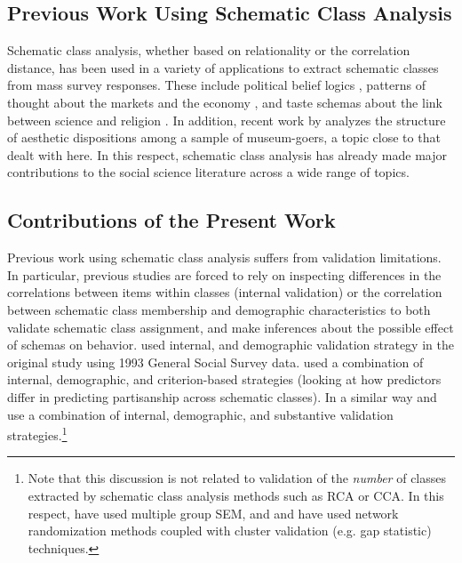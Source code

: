 \documentclass[preprint, authoryear,11pt, 3p]{elsarticle}
\begin{document}
\subsection{Previous Work Using Schematic Class Analysis}
Schematic class analysis, whether based on relationality or the correlation distance, has been used in a variety of applications to extract schematic classes from mass survey responses. These include political belief logics \citep{baldassarri2014neither, daenekindt2017people}, patterns of thought about the markets and the economy \citep{dimaggio2018searching, metzmcDonnell2018multiple}, and taste schemas about the link between science and religion \citep{dimaggio2017culture}. In addition, recent work by \citet{daenekindt2017structure} analyzes the structure of aesthetic dispositions among a sample of museum-goers, a topic close to that dealt with here. In this respect, schematic class analysis has already made major contributions to the social science literature across a wide range of topics. 

\subsection{Contributions of the Present Work}
Previous work using schematic class analysis suffers from validation limitations. In particular, previous studies are forced to rely on inspecting differences in the correlations between items within classes (internal validation) or the correlation between schematic class membership and demographic characteristics to both validate schematic class assignment, and make inferences about the possible effect of schemas on behavior. \citet{goldberg2011mapping} used internal, and demographic validation strategy in the original study using 1993 General Social Survey data.\citet{baldassarri2014neither} used a combination of internal, demographic, and criterion-based strategies (looking at how predictors differ in predicting partisanship across schematic classes). In a similar way \citet{dimaggio2018searching} and \citet{dimaggio2017culture} use a combination of internal, demographic, and substantive validation strategies.\footnote{Note that this discussion is not related to validation of the \emph{number} of classes extracted by schematic class analysis methods such as RCA or CCA. In this respect, \citet{boutyline2017improving} have used multiple group SEM, and \citet{dimaggio2017culture} and \citet{dimaggio2018searching} have used network randomization methods coupled with cluster validation (e.g. gap statistic) techniques.}
\end{document}
